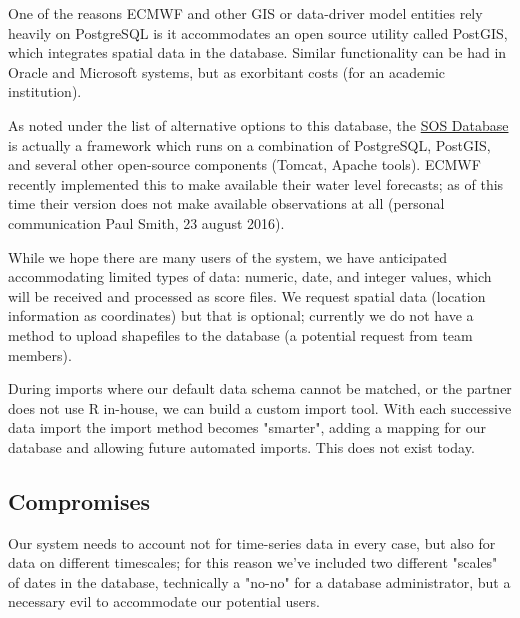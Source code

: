 \documentclass[logos,parttoc,morelanguage=french,morelanguage=german,draft]{orsay-memoire}
\begin{document}
One of the reasons ECMWF and other GIS or data-driver model entities rely heavily on PostgreSQL is it accommodates an open source utility called PostGIS, which integrates spatial data in the database. Similar functionality can be had in Oracle and Microsoft systems, but as exorbitant costs (for an academic institution).

As noted under the list of alternative options to this database, the \href{http://52north.org/473-52-north-sos-4-3-7-now-available}{SOS Database} is actually a framework which runs on a combination of PostgreSQL, PostGIS, and several other open-source components (Tomcat, Apache tools). ECMWF recently implemented this to make available their water level forecasts; as of this time their version does not make available observations at all (personal communication Paul Smith, 23 august 2016).

%
%

While we hope there are many users of the system, we have anticipated accommodating limited types of data: numeric, date, and integer values, which will be received and processed as score files. We request spatial data (location information as coordinates) but that is optional; currently we do not have a method to upload shapefiles to the database (a potential request from team members).

During imports where our default data schema cannot be matched, or the partner does not use R in-house, we can build a custom import tool. With each successive data import the import method becomes "smarter", adding a mapping for our database and allowing future automated imports. This does not exist today.
%
%

\subsection{Compromises}

Our system needs to account not for time-series data in every case, but also for data on different timescales; for this reason we've included two different "scales" of dates in the database, technically a "no-no" for a database administrator, but a necessary evil to accommodate our potential users.
\end{document}
